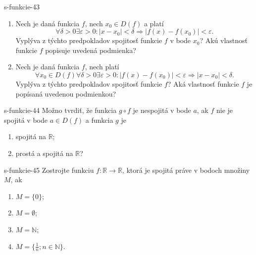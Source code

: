 
\begin{defproblem}{s-funkcie-43}
\begin{enumerate}
\item Nech je daná funkcia $f$, nech $x_0 \in D(f)$ a platí
  $$\forall \delta>0 \exists \varepsilon >0: |x-x_0|<\delta \Rightarrow |f(x)-f(x_0)|<\varepsilon.$$
  Vyplýva z týchto predpokladov spojitosť funkcie $f$ v bode $x_0$? Akú vlastnosť funkcie $f$ popisuje uvedená podmienka?
\item Nech je daná funkcia $f$, nech platí
$$\forall x_0 \in D(f) \forall \delta>0 \exists \varepsilon >0: |f(x)-f(x_0)|<\varepsilon \Rightarrow |x-x_0|<\delta.$$
Vyplýva z týchto predpokladov spojitosť funkcie $f$? Aká vlastnosť funkcie $f$ je popísaná uvedenou podmienkou?
\end{enumerate}
\end{defproblem}

\begin{defproblem}{s-funkcie-44}
Možno tvrdiť, že funkcia $g \circ f$ je nespojitá v bode $a$, ak $f$ nie je spojitá v bode $a \in D(f)$ a funkcia $g$ je
\begin{enumerate}
\item spojitá na $\mathbb{R}$;
\item prostá a spojitá na $\mathbb{R}$?
\end{enumerate}
\end{defproblem}

\begin{defproblem}{s-funkcie-45}
Zostrojte funkciu $f: \mathbb{R} \rightarrow \mathbb{R}$, ktorá je spojitá práve v bodoch množiny $M$, ak
\begin{enumerate}
\item $M=\{0\}$;
\item $M=\emptyset$;
\item $M=\mathbb{N}$;
\item $M=\{\frac{1}{n};n \in \mathbb{N}\}$.
\end{enumerate}
\end{defproblem}

